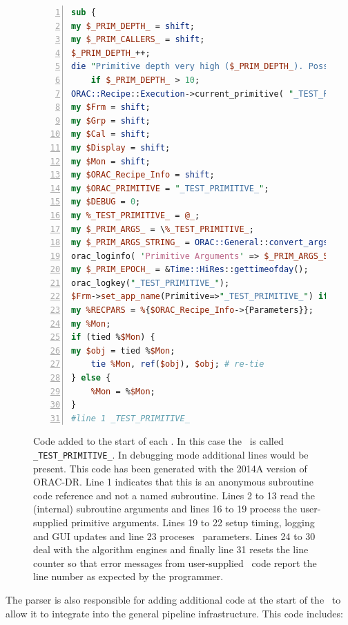 \documentclass[final,authoryear,5p,times,twocolumn]{elsarticle}
\begin{document}
\begin{figure}[t]
\begin{lstlisting}[language=perl,numbers=left]
sub {
my $_PRIM_DEPTH_ = shift;
my $_PRIM_CALLERS_ = shift;
$_PRIM_DEPTH_++;
die "Primitive depth very high ($_PRIM_DEPTH_). Possible recursive primitive"
    if $_PRIM_DEPTH_ > 10;
ORAC::Recipe::Execution->current_primitive( "_TEST_PRIMITIVE_", $_PRIM_CALLERS_);
my $Frm = shift;
my $Grp = shift;
my $Cal = shift;
my $Display = shift;
my $Mon = shift;
my $ORAC_Recipe_Info = shift;
my $ORAC_PRIMITIVE = "_TEST_PRIMITIVE_";
my $DEBUG = 0;
my %_TEST_PRIMITIVE_ = @_;
my $_PRIM_ARGS_ = \%_TEST_PRIMITIVE_;
my $_PRIM_ARGS_STRING_ = ORAC::General::convert_args_to_string( %$_PRIM_ARGS_ );
orac_loginfo( 'Primitive Arguments' => $_PRIM_ARGS_STRING_ );
my $_PRIM_EPOCH_ = &Time::HiRes::gettimeofday();
orac_logkey("_TEST_PRIMITIVE_");
$Frm->set_app_name(Primitive=>"_TEST_PRIMITIVE_") if $Frm->can("set_app_name");
my %RECPARS = %{$ORAC_Recipe_Info->{Parameters}};
my %Mon;
if (tied %$Mon) {
my $obj = tied %$Mon;
    tie %Mon, ref($obj), $obj; # re-tie
} else {
    %Mon = %$Mon;
}
#line 1 _TEST_PRIMITIVE_
\end{lstlisting}
  \caption{Code added to the start of each \primitive. In this case
    the \primitive\ is called \texttt{\_TEST\_PRIMITIVE\_}. In
    debugging mode additional lines would be present. This code has
    been generated with the 2014A version of ORAC-DR. Line 1 indicates
    that this is an anonymous subroutine code reference and not a
    named subroutine. Lines 2 to 13 read the (internal) subroutine
    arguments and lines 16 to 19 process the user-supplied primitive
    arguments. Lines 19 to 22 setup timing, logging and GUI updates
    and line 23 proceses \recipe\ parameters. Lines 24 to 30 deal with
    the algorithm engines and finally line 31 resets the line counter
    so that error messages from user-supplied \primitive\ code report
    the line number as expected by the programmer.}
\label{fig:primhead}
\end{figure}

The parser is also responsible for adding additional code at the
start of the \primitive\ to allow it to integrate into the general
pipeline infrastructure. This code includes:
\end{document}
